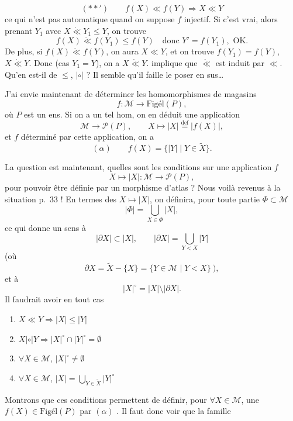 \documentclass[11pt,a4paper]{article}
\begin{document}
\[
  (**') \qquad f(X) \ll f(Y) \Longrightarrow X \ll Y
\]
ce qui n'est pas automatique  quand on suppose \struck{\ill{}} $f$ injectif. Si c'est vrai, alors prenant $Y_1$ avec $X \mathrel{\mathring{\ll}} Y_1 \leq Y$, on trouve
\[
  f(X) \mathrel{\mathring{\ll}} f(Y_1) \leq f(Y) \quad \text{donc } Y' = f(Y_1), \text{ OK.}
\]
De plus, si $f(X) \mathrel{\mathring{\ll}} f(Y)$, on aura $X \ll Y$, et  on trouve $f(Y_1) = f(Y)$,  $X \mathrel{\mathring{\ll}} Y$. Donc (cas  $Y_1 = Y$), on a $X \mathrel{\mathring{\ll}} Y$. \ill{} implique que $\mathrel{\mathring{\ll}}$ est induit par $\ll$. Qu'en est-il de $\leq$, $|\circ|$ ? Il semble qu'il faille le poser en sus…

J'ai envie maintenant de déterminer les homomorphismes de magasins
\[
  f : \mathcal{M} \longrightarrow \text{Figél}(P),
\]
où $P$ est un ens. Si on a un tel hom, on en déduit une application
\[
  \mathcal{M} \longrightarrow \mathcal{P}(P), \qquad X \longmapsto |X| \overset{\mathrm{def}}{=} |f(X)|,
\]
et \ill{} $f$  déterminé par cette application, on a
\[
  (\alpha) \qquad f(X) = \{ |Y| \mid Y \in \widetilde{X} \}.
\]

La question est maintenant, quelles sont les conditions sur une application $f$
\[
  X \longmapsto |X| : \mathcal{M} \longrightarrow \mathcal{P}(P),
\]
pour \struck{\ill{}} pouvoir être définie par un morphisme d'atlas ? Nous voilà revenus à la situation p.~33 ! En termes des $X \mapsto |X|$, on définira, pour  toute \struck{\ill{}} partie \struck{\ill{}} $\Phi \subset \mathcal{M}$
\[
  |\Phi| = \bigcup_{X \in \Phi} |X|,
\]
ce qui donne un sens à
\[
  |\partial X| \subset |X|, \qquad |\partial X| = \bigcup_{Y < X} |Y|
\]
(où
\[
  \partial X = \widetilde{X} - \{X\} = \{ Y \in \mathcal{M} \mid Y < X \} \ ),
\]
et à
\[
  |X|^{\circ} = |X| \setminus |\partial X|.
\]
Il faudrait avoir en tout cas
\begin{enumerate}
  \item[(i)] $X \ll Y \Longrightarrow |X| \leq |Y|$
  \item[(ii)] $X \mathrel{|\circ|} Y \Longrightarrow |X|^{\circ} \cap |Y|^{\circ} = \emptyset$
  \item[(iii)] $\forall X \in \mathcal{M}$, $|X|^{\circ} \neq \emptyset$
  \item[(iv)] $\forall X \in \mathcal{M}$, $|X| = \bigcup_{Y \in \widetilde{X}} |Y|^{\circ}$
\end{enumerate}
Montrons que ces conditions permettent de définir, pour $\forall X \in \mathcal{M}$, une  $f(X) \in \text{Figél}(P)$ par $(\alpha)$ . Il faut donc voir que la famille
\end{document}
